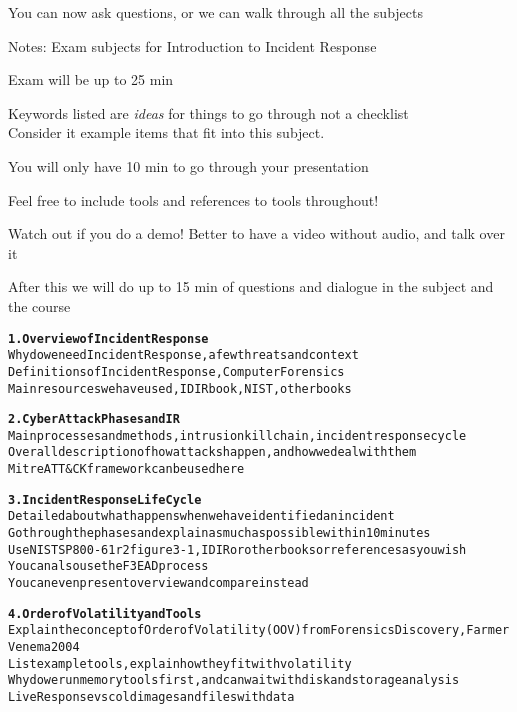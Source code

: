 \documentclass[Screen16to9,17pt]{foils}
\begin{document}

You can now ask questions, or we can walk through all the subjects

Notes: Exam subjects for Introduction to Incident Response
\begin{list2}
\item Exam will be up to 25 min
\item Keywords listed are \emph{ideas} for things to go through not a checklist\\
Consider it example items that fit into this subject.
\item You will only have 10 min to go through your presentation
\item Feel free to include tools and references to tools throughout!
\item Watch out if you do a demo! Better to have a video without audio, and talk over it
\item After this we will do up to 15 min of questions and dialogue in the subject and the course
\end{list2}



\begin{alltt}
{\bf 1. Overview of Incident Response}\\
Why do we need Incident Response, a few threats and context
Definitions of Incident Response, Computer Forensics
Main resources we have used, IDIR book, NIST, other books

{\bf 2. Cyber Attack Phases and IR}\\
Main processes and methods, intrusion kill chain, incident response cycle
Overall description of how attacks happen, and how we deal with them
Mitre ATT&CK framework can be used here
\end{alltt}



\begin{alltt}
{\bf 3. Incident Response Life Cycle}\\
Detailed about what happens when we have identified an incident
Go through the phases and explain as much as possible within 10minutes
Use NIST SP800-61r2 figure 3-1, IDIR or other books or references as you wish
You can also use the F3EAD process
You can even present overview and compare instead

{\bf 4. Order of Volatility and Tools}\\
Explain the concept of Order of Volatility (OOV) from Forensics Discovery, Farmer Venema 2004
List example tools, explain how they fit with volatility
Why do we run memory tools first, and can wait with disk and storage analysis
Live Response vs cold images and files with data
\end{alltt}
\end{document}

